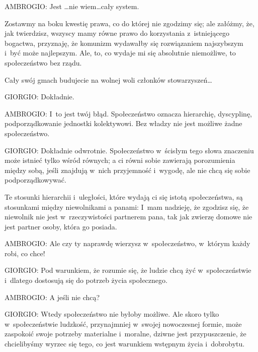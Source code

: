 \documentclass[oneside,polish,11pt,sfheadings]{mwbk}
\begin{document}
 
\noindent AMBROGIO: Jest \ldots nie wiem\ldots cały system. 

 
Zostawmy na boku kwestię prawa, co do której nie zgodzimy się; ale załóżmy, że, jak twierdzisz, wszyscy mamy równe prawo
do korzystania z~istniejącego bogactwa, przyznaję, że komunizm wydawałby się rozwiązaniem najszybszym i~być może
najlepszym. Ale, to, co wydaje mi się absolutnie niemożliwe, to społeczeństwo bez rządu. 

 
Cały swój gmach budujecie na wolnej woli członków stowarzyszeń\ldots 




 
\noindent GIORGIO: Dokładnie. 




 
\noindent AMBROGIO: I~to jest twój błąd. Społeczeństwo oznacza hierarchię, dyscyplinę, podporządkowanie jednostki kolektywowi. Bez
władzy nie jest możliwe żadne społeczeństwo. 




 
\noindent GIORGIO:  Dokładnie odwrotnie. Społeczeństwo w~ścisłym tego słowa znaczeniu może istnieć tylko wśród równych; a ci równi
sobie zawierają porozumienia między sobą, jeśli znajdują w~nich przyjemność i~wygodę, ale nie chcą się sobie
podporządkowywać. 

 
Te stosunki hierarchii i~uległości, które wydają ci się istotą społeczeństwa, są stosunkami między niewolnikami a
panami: I~mam nadzieję, że zgodzisz się, że niewolnik nie jest w~rzeczywistości partnerem pana, tak jak zwierzę domowe
nie jest partner osoby, która go posiada. 




 
\noindent AMBROGIO: Ale czy ty naprawdę wierzysz w~społeczeństwo, w~którym każdy robi, co chce! 




 
\noindent GIORGIO: Pod warunkiem, że rozumie się, że ludzie chcą żyć w~społeczeństwie i~dlatego dostosują się do potrzeb życia
społecznego. 




 
\noindent AMBROGIO: A jeśli nie chcą? 




 
\noindent GIORGIO: Wtedy społeczeństwo nie byłoby możliwe. Ale skoro tylko w~społeczeństwie ludzkość, przynajmniej w~swojej
nowoczesnej formie, może zaspokoić swoje potrzeby materialne i~moralne, dziwne jest przypuszczenie, że chcielibyśmy
wyrzec się tego, co jest warunkiem wstępnym życia i~dobrobytu. 
\end{document}
